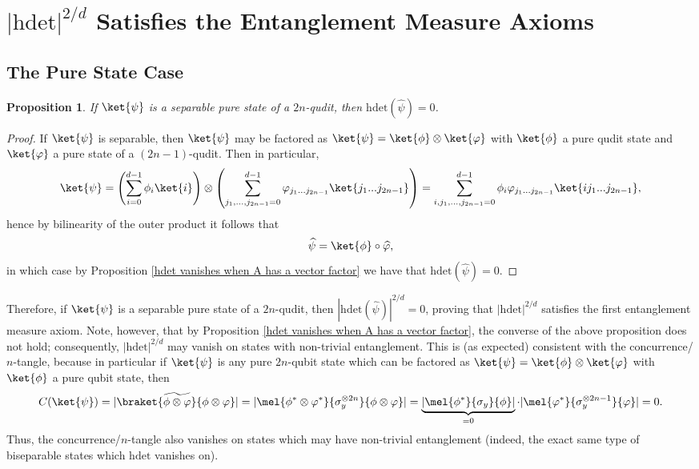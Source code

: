 \documentclass{article}
\newtheorem{proposition}{Proposition}
\begin{document}
\section{$|\mathrm{hdet}|^{2/d}$ Satisfies the Entanglement Measure Axioms}
\subsection{The Pure State Case}
\begin{proposition}\label{hdet on separable pure states}
    If $\ket{\psi}$ is a separable pure state of a $2n$-qudit, then $\mathrm{hdet}(\widehat{\psi}) = 0$.
\end{proposition}
\begin{proof}
    If $\ket{\psi}$ is separable, then $\ket{\psi}$ may be factored as $\ket{\psi} = \ket{\phi}\otimes \ket{\varphi}$ with $\ket{\phi}$ a pure qudit state and $\ket{\varphi}$ a pure state of a $(2n-1)$-qudit. Then in particular, 
    \[\ket{\psi} = \left(\sum\limits_{i=0}^{d-1}\phi_i\ket{i}\right)\otimes \left(\sum\limits_{j_1,...,j_{2n-1}=0}^{d-1}\varphi_{j_1...j_{2n-1}}\ket{j_1...j_{2n-1}}\right) = \sum\limits_{i,j_1,...,j_{2n-1}=0}^{d-1}\phi_i\varphi_{j_1...j_{2n-1}}\ket{ij_1...j_{2n-1}},\]
    hence by bilinearity of the outer product it follows that 
    \[\widehat{\psi} = \ket{\phi}\circ \widehat{\varphi},\]
    in which case by Proposition \ref{hdet vanishes when A has a vector factor} we have that $\mathrm{hdet}(\widehat{\psi})=0$. 
\end{proof}
Therefore, if $\ket{\psi}$ is a separable pure state of a $2n$-qudit, then $|\mathrm{hdet}(\widehat{\psi})|^{2/d}=0$, proving that $|\mathrm{hdet}|^{2/d}$ satisfies the first entanglement measure axiom. Note, however, that by Proposition \ref{hdet vanishes when A has a vector factor}, the converse of the above proposition does not hold; consequently, $|\mathrm{hdet}|^{2/d}$ may vanish on states with non-trivial entanglement. This is (as expected) consistent with the concurrence/$n$-tangle, because in particular if $\ket{\psi}$ is any pure $2n$-qubit state which can be factored as $\ket{\psi} = \ket{\phi}\otimes \ket{\varphi}$ with $\ket{\phi}$ a pure qubit state, then 
\[C(\ket{\psi}) = |\braket{\widetilde{\phi\otimes \varphi}}{\phi\otimes \varphi}| = |\mel{\phi^*\otimes \varphi^*}{\sigma_y^{\otimes 2n}}{\phi\otimes \varphi}| = \underbrace{|\mel{\phi^*}{\sigma_y}{\phi}|}_{=0}\cdot |\mel{\varphi^*}{\sigma_y^{\otimes 2n-1}}{\varphi}| = 0.\]
Thus, the concurrence/$n$-tangle also vanishes on states which may have non-trivial entanglement (indeed, the exact same type of biseparable states which $\mathrm{hdet}$ vanishes on). 
\end{document}
